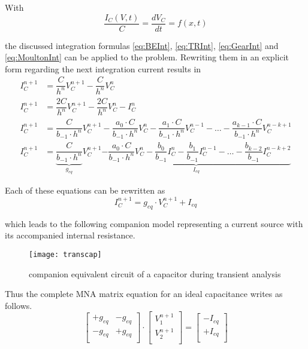 With
\begin{equation}
\dfrac{I_C(V, t)}{C} = \dfrac{d V_C}{d t} = f(x,t)
\end{equation}

the discussed integration formulas \eqref{eq:BEInt}, \eqref{eq:TRInt},
\eqref{eq:GearInt} and \eqref{eq:MoultonInt} can be applied to the
problem.  Rewriting them in an explicit form regarding the next
integration current results in
\begin{align}
\label{eq:EulerIC}
I_C^{n+1} &= \dfrac{C}{h^{n}} V_C^{n+1} - \dfrac{C}{h^{n}} V_C^{n}\\
I_C^{n+1} &= \dfrac{2C}{h^{n}} V_C^{n+1} - \dfrac{2C}{h^{n}} V_C^{n} - I_C^n\\
I_C^{n+1} &= \dfrac{C}{b_{-1}\cdot h^{n}} V_C^{n+1} - \dfrac{a_0\cdot C}{b_{-1}\cdot h^{n}} V_C^{n} - \dfrac{a_1\cdot C}{b_{-1}\cdot h^{n}} V_C^{n-1} - \ldots - \dfrac{a_{k-1}\cdot C}{b_{-1}\cdot h^{n}} V_C^{n-k+1}\\
I_C^{n+1} &= \underbrace{\dfrac{C}{b_{-1}\cdot h^{n}}}_{g_{eq}} V_C^{n+1} \underbrace{- \dfrac{a_0\cdot C}{b_{-1}\cdot h^{n}} V_C^{n} - \dfrac{b_0}{b_{-1}} I_C^n - \dfrac{b_1}{b_{-1}} I_C^{n-1} - \ldots - \dfrac{b_{k-2}}{b_{-1}} I_C^{n-k+2}}_{I_{eq}}
\end{align}

Each of these equations can be rewritten as
\begin{equation}
I_C^{n+1} = g_{eq}\cdot V_C^{n+1} + I_{eq}
\end{equation}

which leads to the following companion model representing a current
source with its accompanied internal resistance.
\begin{figure}[ht]
\begin{center}
\texttt{[image: transcap]}
\end{center}
\caption{companion equivalent circuit of a capacitor during transient analysis}
\label{fig:TransCap}
\end{figure}
\FloatBarrier

Thus the complete MNA matrix equation for an ideal capacitance writes
as follows.
\begin{equation}
\begin{bmatrix}
+g_{eq} & -g_{eq}\\
-g_{eq} & +g_{eq}\\
\end{bmatrix}
\cdot
\begin{bmatrix}
V_1^{n+1}\\
V_2^{n+1}\\
\end{bmatrix}
=
\begin{bmatrix}
-I_{eq}\\
+I_{eq}\\
\end{bmatrix}
\end{equation}

